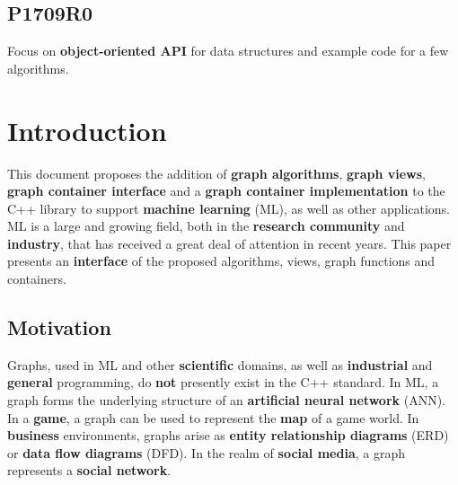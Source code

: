 \documentclass[10pt,onecolumn]{article}
\begin{document}
\subsection*{P1709R0}
Focus on \textbf{object-oriented API} for data structures and example code for a few algorithms.

\section{Introduction}
This document proposes the addition of \textbf{graph algorithms}, \textbf{graph views}, \textbf{graph container interface} and a \textbf{graph container implementation} to the C++ library to support \textbf{machine learning} (ML), as well as other applications. ML is a large and growing field, both in the \textbf{research community} and \textbf{industry}, that has received a great deal of attention in recent years. This paper presents an \textbf{interface} of the proposed algorithms, views, graph functions and containers.

\subsection{Motivation}
Graphs, used in ML and other \textbf{scientific} domains, as well as \textbf{industrial} and \textbf{general} programming, do \textbf{not} presently exist in the C++ standard. In ML, a graph forms the underlying structure of an \textbf{artificial neural network} (ANN). In a \textbf{game}, a graph can be used to
represent the \textbf{map} of a game world. In \textbf{business} environments, graphs arise as \textbf{entity relationship diagrams} (ERD) or \textbf{data flow diagrams} (DFD). In the realm of \textbf{social media}, a graph represents a \textbf{social network}.
\end{document}
